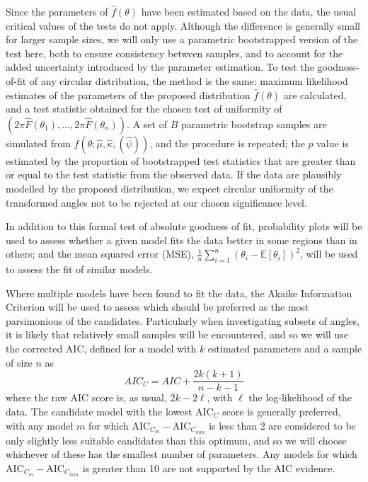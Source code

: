 \documentclass[../../ArchStats.tex]{subfiles}
\begin{document}
Since the parameters of $\hat{f}(\theta)$ have been estimated based on the data, the usual critical values of the tests do not apply. Although the difference is generally small for larger sample sizes, we will only use a parametric bootstrapped version of the test here,  both to ensure consistency between samples, and to account for the added uncertainty introduced by the parameter estimation. To test the goodness-of-fit of any circular distribution, the method is the same: maximum likelihood estimates of the parameters of the proposed distribution $\hat{f}(\theta)$ are calculated, and a test statistic  obtained for the chosen test of uniformity of $( 2\pi \hat{F}(\theta_1), \dots, 2\pi \hat{F}(\theta_n) )$. A set of $B$ parametric bootstrap samples are simulated from $\hat{f}(\theta; \hat{\mu}, \hat{\kappa}, (\hat{\psi}))$, and the procedure is repeated; the $p$ value is estimated by the proportion of bootstrapped test statistics that are greater than or equal to the test statistic from the observed data. If the data are plausibly modelled by the  proposed distribution, we expect circular uniformity of the transformed angles not to be rejected at our chosen significance level.

In addition to this formal test of absolute goodness of fit, probability plots will be used to assess whether a given model fits the data better in some regions than in others; and the mean squared error (MSE), $\frac{1}{n} \sum_{i=1}^n (\theta_i - \mathbb{E}\left[\theta_i\right])^2$, will be used to assess the fit of similar models. 

Where multiple models have been found to fit the data, the Akaike Information Criterion \cite{Akaike1974} will be used to assess which should be preferred as the most parsimonious of the candidates. Particularly when investigating subsets of angles, it is likely that relatively small samples will be encountered, and so we will use the corrected AIC, defined for a model with $k$ estimated parameters and a sample of size $n$ as
\begin{equation}
AIC_C = AIC + \frac{2k(k+1)}{n-k-1}
\end{equation}
where the raw AIC score is, as usual, $2k - 2\ell$, with $\ell$ the log-likelihood of the data. The candidate model with the lowest AIC$_C$ score is generally preferred, with any model $m$ for which AIC$_{C_m} - $AIC$_{C_{min}}$ is less than 2 are considered to be only slightly less suitable candidates than this optimum, and so we will choose whichever of these has the smallest number of parameters. Any models for which AIC$_{C_m} - $AIC$_{C_{min}}$ is greater than 10 are not supported by the AIC evidence.
\end{document}
